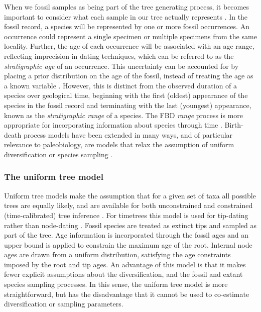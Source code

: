 When we  fossil samples as being part of the tree generating process, it becomes important to consider what each sample in our tree actually represents \citep{Hopkins2018}.
In the fossil record, a species will be represented by one or more fossil occurrences.
An occurrence could represent a single specimen or multiple specimens from the same locality.
Further, the age of each occurrence will be associated with an age range, reflecting imprecision in dating techniques, which can be referred to as the \textit{stratigraphic age} of an occurrence.
This uncertainty can be accounted for by placing a prior distribution on the age of the fossil, instead of treating the age as a known variable \citep{Drummond2016,BaridoSottani2019a}.
However, this is distinct from the observed duration of a species over geological time, beginning with the first (oldest) appearance of the species in the fossil record and terminating with the last (youngest) appearance, known as the \textit{stratigraphic range} of a species.
The FBD \textit{range} process is more appropriate for incorporating information about species through time \citep{Stadler2018}.
Birth-death process models have been extended in many ways, and of particular relevance to paleobiology,  are models that relax the assumption of uniform diversification or species sampling \citep{Hoehna2011,Stadler2013b,Gavryushkina2014,Zhang2016,Kuehnert2016,BaridoSottani2018}.

\subsubsection{The uniform tree model}

Uniform tree models make the assumption that for a given set of taxa all possible trees are equally likely, and are available for both unconstrained and constrained (time-calibrated) tree inference \citep{Huelsenbeck2001a,Ronquist2012a}.
For timetrees this model is used for tip-dating rather than node-dating \citep{Ronquist2012a}.
Fossil species are treated as extinct tips and sampled as part of the tree.
Age information is incorporated through the fossil ages and an upper bound is applied to constrain the maximum age of the root.
Internal node ages are drawn from a uniform distribution, satisfying the age constraints imposed by the root and tip ages.
An advantage of this model is that it makes fewer explicit assumptions about the diversification, and the fossil and extant species sampling processes.
In this sense, the  uniform tree model is more straightforward, but has the disadvantage that it cannot be used to co-estimate diversification or sampling parameters.

